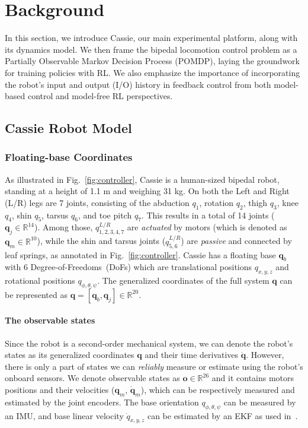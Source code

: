 \section{Background}\label{sec:background}
In this section, we introduce Cassie, our main experimental platform, along with its dynamics model. 
We then frame the bipedal locomotion control problem as a Partially Observable Markov Decision Process (POMDP), laying the groundwork for training policies with RL. We also emphasize the importance of incorporating the robot's input and output (I/O) history in feedback control from both model-based control and model-free RL perspectives.


\subsection{Cassie Robot Model}
\subsubsection{Floating-base Coordinates}\label{subsec:states}
As illustrated in Fig.~\ref{fig:controller}, Cassie is a human-sized bipedal robot, standing at a height of 1.1 m and weighing 31 kg.
On both the Left and Right (L/R) legs are 7 joints, consisting of the abduction $q_1$, rotation $q_2$, thigh $q_3$, knee $q_4$, shin $q_5$, tarsus $q_6$, and toe pitch $q_7$. This results in a total of 14 joints ($\mathbf{q}_j \in \mathbb{R}^{14}$).
Among those, $q^{L/R}_{1,2,3,4,7}$ are \emph{actuated} by motors (which is denoted as $\mathbf{q}_m \in \mathbb{R}^{10}$), while the shin and tarsus joints ($q^{L/R}_{5,6}$) are \emph{passive} and connected by leaf springs, as annotated in Fig.~\ref{fig:controller}. 
Cassie has a floating base $\mathbf{q}_b$ with 6 Degree-of-Freedoms~(DoFs) which are translational positions $q_{x,y,z}$ and rotational positions $q_{\phi,\theta,\psi}$. 
The generalized coordinates of the full system $\mathbf{q}$ can be represented as $\mathbf{q}=[\mathbf{q}_b, \mathbf{q}_j] \in \mathbb{R}^{20}$. 
\paragraph{The observable states}
Since the robot is a second-order mechanical system, we can denote the robot's states as its generalized coordinates $\mathbf{q}$ and their time derivatives $\dot{\mathbf{q}}$. 
However, there is only a part of states we can \emph{reliably} measure or estimate using the robot's onboard sensors. 
We denote observable states as $\mathbf{o}\in \mathbb{R}^{26}$ and it contains motors positions and their velocities ($\mathbf{q}_m$, $\dot{\mathbf{q}}_m$), which can be respectively measured and estimated by the joint encoders. The base orientation ${q}_{\phi,\theta,\psi}$ can be measured by an IMU, and base linear velocity $\dot{q}_{x,y,z}$ can be estimated by an EKF as used in~\citep{xie2020learning}.



